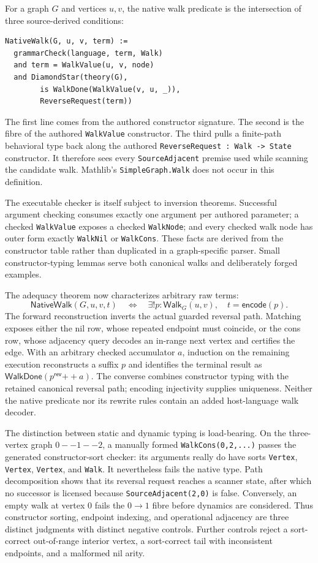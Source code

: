 \documentclass[11pt]{article}
\theoremstyle{remark}
\newcommand{\code}[1]{\texttt{#1}}
\begin{document}
For a graph \(G\) and vertices \(u,v\), the native walk predicate is the
intersection of three source-derived conditions:
\begin{lstlisting}[style=graphlang,language={}]
NativeWalk(G, u, v, term) :=
  grammarCheck(language, term, Walk)
  and term = WalkValue(u, v, node)
  and DiamondStar(theory(G),
        is WalkDone(WalkValue(v, u, _)),
        ReverseRequest(term))
\end{lstlisting}
The first line comes from the authored constructor signature.  The second is
the fibre of the authored \code{WalkValue} constructor.  The third pulls a
finite-path behavioral type back along the authored
\code{ReverseRequest : Walk -> State} constructor.  It therefore sees every
\code{SourceAdjacent} premise used while scanning the candidate walk.
Mathlib's \code{SimpleGraph.Walk} does not occur in this definition.

The executable checker is itself subject to inversion theorems.  Successful
argument checking consumes exactly one argument per authored parameter; a
checked \code{WalkValue} exposes a checked \code{WalkNode}; and every checked
walk node has outer form exactly \code{WalkNil} or \code{WalkCons}.  These
facts are derived from the constructor table rather than duplicated in a
graph-specific parser.  Small constructor-typing lemmas serve both canonical
walks and deliberately forged examples.

The adequacy theorem now characterizes arbitrary raw terms:
\[
  \mathsf{NativeWalk}(G,u,v,t)
  \quad\Longleftrightarrow\quad
  \exists! p:\mathsf{Walk}_G(u,v),\quad t=\mathsf{encode}(p).
\]
The forward reconstruction inverts the actual guarded reversal path.
Matching exposes either the nil row, whose repeated endpoint must coincide,
or the cons row, whose adjacency query decodes an in-range next vertex and
certifies the edge.  With an arbitrary checked accumulator \(a\), induction
on the remaining execution reconstructs a suffix \(p\) and identifies the
terminal result as \(\mathsf{WalkDone}(p^{\mathsf{rev}}\mathbin{++}a)\).
The converse combines constructor typing with the retained canonical
reversal path; encoding injectivity supplies uniqueness.  Neither the native
predicate nor its rewrite rules contain an added host-language walk decoder.

The distinction between static and dynamic typing is load-bearing.  On the
three-vertex graph \(0--1--2\), a manually formed
\code{WalkCons(0,2,...)} passes the generated constructor-sort checker: its
arguments really do have sorts \code{Vertex}, \code{Vertex}, \code{Vertex},
and \code{Walk}.  It nevertheless fails the native type.  Path decomposition
shows that its reversal request reaches a scanner state, after which no
successor is licensed because \code{SourceAdjacent(2,0)} is false.  Conversely,
an empty walk at vertex \(0\) fails the \(0\to1\) fibre before dynamics are
considered.  Thus constructor sorting, endpoint indexing, and operational
adjacency are three distinct judgments with distinct negative controls.
Further controls reject a sort-correct out-of-range interior vertex, a
sort-correct tail with inconsistent endpoints, and a malformed nil arity.
\end{document}
